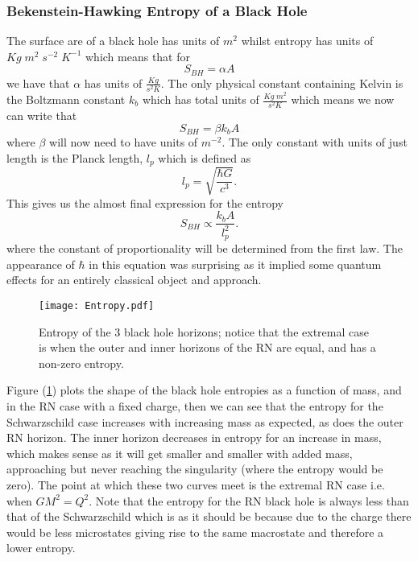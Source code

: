 \documentclass[12pt]{article}
\numberwithin{equation}{section}
\numberwithin{figure}{section}
\begin{document}
\subsubsection{Bekenstein-Hawking Entropy of a Black Hole} %
\label{sub:bekenstein_hawking_entropy_of_a_black_hole}
The surface are of a black hole has units of $m^2$ whilst entropy has units of $Kg\;m^{2}\;s^{-2}\;K^{-1}$ which means that for
\begin{equation}
	S_{BH}=\alpha A
\end{equation}
we have that $\alpha$ has units of $\frac{Kg}{s^{2}K}$. The only physical constant containing Kelvin is the Boltzmann constant $k_{b}$ which has total units of $\frac{Kg\;m^{2}}{s^{2}K}$ which means we now can write that
\begin{equation}
	S_{BH}=\beta k_{b}A
\end{equation}
where $\beta$ will now need to have units of $m^{-2}$. The only constant with units of just length is the Planck length, $l_{p}$ which is defined as
\begin{equation}
	l_{p} =	\sqrt{\frac{\hbar G}{c^{3}}}.
\end{equation}
This gives us the almost final expression for the entropy
\begin{equation}
	S_{BH}\propto \frac{k_{b}A}{l_{p}^{2}}.
\end{equation}
where the constant of proportionality will be determined from the first law. The appearance of $\hbar$ in this equation was surprising as it implied some quantum effects for an entirely classical object and approach.
\begin{figure}
	\centering
        \texttt{[image: Entropy.pdf]}
	\caption{Entropy of the 3 black hole horizons; notice that the extremal case is when the outer and inner horizons of the RN are equal, and has a non-zero entropy.}
	\label{fig:entropy}
\end{figure}
Figure (\ref{fig:entropy}) plots the shape of the black hole entropies as a function of mass, and in the RN case with a fixed charge, then we can see that the entropy for the Schwarzschild case increases with increasing mass as expected, as does the outer RN horizon. The inner horizon decreases in entropy for an increase in mass, which makes sense as it will get smaller and smaller with added mass, approaching but never reaching the singularity (where the entropy would be zero). The point at which these two curves meet is the extremal RN case i.e. when $GM^{2}=Q^{2}$. Note that the entropy for the RN black hole is always less than that of the Schwarzschild which is as it should be because due to the charge there would be less microstates giving rise to the same macrostate and therefore a lower entropy. 
\end{document}
